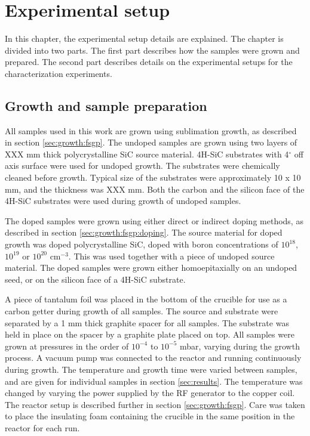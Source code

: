 
\chapter{Experimental setup}
\label{sec:experimental_details}
In this chapter, the experimental setup details are explained. The chapter is divided into two parts. The first part describes how the samples were grown and prepared. The second part describes details on the experimental setups for the characterization experiments. 

\section{Growth and sample preparation}
\label{sec:experimental:samples}
All samples used in this work are grown using sublimation growth, as described in section \ref{sec:growth:fsgp}. The undoped samples are grown using two layers of XXX mm thick polycrystalline SiC source material. 4H-SiC substrates with 4$^\circ$ off axis surface were used for undoped growth. The substrates were chemically cleaned before growth. Typical size of the substrates were approximately 10 x 10 mm, and the thickness was XXX mm. Both the carbon and the silicon face of the 4H-SiC substrates were used during growth of undoped samples. 

The doped samples were grown using either direct or indirect doping methods, as described in section \ref{sec:growth:fsgp:doping}. The source material for doped growth was doped polycrystalline SiC, doped with boron concentrations of $10^{18}$, $10^{19}$ or $10^{20}$ cm$^{-3}$. This was used together with a piece of undoped source material. The doped samples were grown either homoepitaxially on an undoped seed, or on the silicon face of a 4H-SiC substrate. 

A piece of tantalum foil was placed in the bottom of the crucible for use as a carbon getter during growth of all samples. The source and substrate were separated by a 1 mm thick graphite spacer for all samples. The substrate was held in place on the spacer by a graphite plate placed on top. All samples were grown at pressures in the order of $10^{-4}$ to $10^{-5}$ mbar, varying during the growth process. A vacuum pump was connected to the reactor and running continuously during growth. The temperature and growth time were varied between samples, and are given for individual samples in section \ref{sec:results}. The temperature was changed by varying the power supplied by the RF generator to the copper coil. The reactor setup is described further in section \ref{sec:growth:fsgp}. Care was taken to place the insulating foam containing the crucible in the same position in the reactor for each run. 

